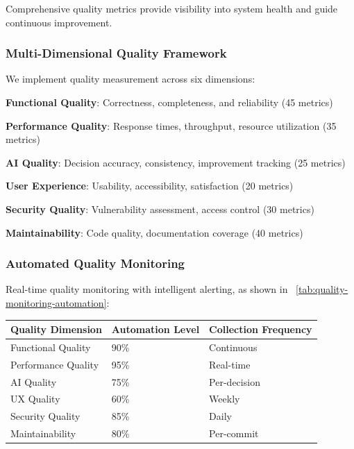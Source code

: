 Comprehensive quality metrics provide visibility into system health and guide continuous improvement.

\subsubsection*{Multi-Dimensional Quality Framework}

We implement quality measurement across six dimensions:

\begin{compactlist}
    \item \textbf{Functional Quality}: Correctness, completeness, and reliability (45 metrics)
    \item \textbf{Performance Quality}: Response times, throughput, resource utilization (35 metrics)
    \item \textbf{AI Quality}: Decision accuracy, consistency, improvement tracking (25 metrics)
    \item \textbf{User Experience}: Usability, accessibility, satisfaction (20 metrics)
    \item \textbf{Security Quality}: Vulnerability assessment, access control (30 metrics)
    \item \textbf{Maintainability}: Code quality, documentation coverage (40 metrics)
\end{compactlist}

\subsubsection*{Automated Quality Monitoring}

Real-time quality monitoring with intelligent alerting, as shown in ~\ref{tab:quality-monitoring-automation}:

\begin{center}
\begin{tabular}{@{}lll@{}}
\toprule
\textbf{Quality Dimension} & \textbf{Automation Level} & \textbf{Collection Frequency} \\
\midrule
Functional Quality & 90\% & Continuous \\
Performance Quality & 95\% & Real-time \\
AI Quality & 75\% & Per-decision \\
UX Quality & 60\% & Weekly \\
Security Quality & 85\% & Daily \\
Maintainability & 80\% & Per-commit \\
\bottomrule
\end{tabular}
\label{tab:quality-monitoring-automation}
\end{center}

